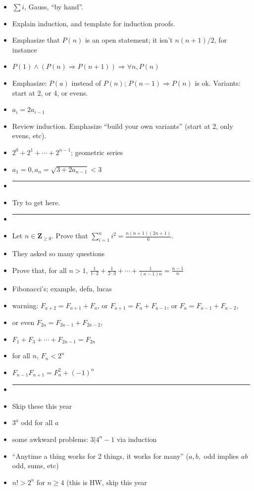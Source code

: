 \documentclass[12pt]{article}
\begin{document}
\begin{itemize}
\item $\sum i$,  Gauss, ``by hand''. 
\item Explain induction, and template for induction proofs. 
\item Emphasize that $P(n)$ is an open statement; it isn't $n(n+1)/2$, for instance
\item $P(1) \wedge (P(n) \Rightarrow P(n+1)) \Rightarrow \forall n, P(n)$
\item Emphasize: $P(a)$ instead of $P(n)$; $P(n-1) \Rightarrow P(n)$ is ok. Variants: start at 2, or 4, or evens.
\item $a_i = 2a_{i-1}$ 
\item Review induction. Emphasize ``build your own variants'' (start at 2, only evens, etc).
\item $2^0 + 2^1 + \cdots + 2^{n-1}$; geometric series
\item $a_1 = 0, a_n = \sqrt{3 + 2a_{n-1}} < 3$
\item []       \vspace{0.1cm}\hrule\vspace{-0.4cm}
  
\item Try to get here. 
\item []       \vspace{0.1cm}\hrule\vspace{-0.4cm}    
\item Let $n \in \mathbf{Z}_{\geq 0}$. Prove that $\displaystyle{\sum}_{i = 1}^n i^2 = \frac{n(n+1)(2n+1) }{6}$. 
\item They asked so many questions

\item Prove that, for all $n > 1$, $\frac{1}{1\cdot 2} + \frac{1}{2 \cdot 3} + \cdots + \frac{1}{(n-1)n} = \frac{n-1}{n}$
\item Fibonacci's; example, defn, lucas
\item warning: $F_{a+2} = F_{a+1} + F_{a}$, or $F_{a+1} = F_{a} + F_{a-1}$, or $F_{a} = F_{a-1} + F_{a-2}$,
\item or even $F_{2a} = F_{2a-1} + F_{2a-2}$,
\item $F_1 + F_3 + \cdots + F_{2n-1} = F_{2n}$
\item for all $n$, $F_n < 2^n$
\item $F_{n-1}F_{n+1} = F_n^2 + (-1)^{n}$
\item []       \vspace{0.1cm}\hrule\vspace{-0.4cm}  
\item Skip these this year
\item $3^a$ odd for all $a$
\item some awkward problems: $3 | 4^n-1$ via induction  
\item ``Anytime a thing works for 2 things, it works for many'' ($a,b,$ odd implies $ab$ odd, sums, etc)
\item $n! > 2^n$ for $n \geq 4$ (this is HW, skip this year

\end{itemize}
\end{document}
